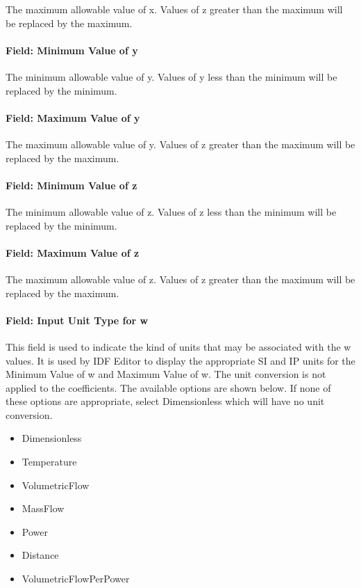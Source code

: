 The maximum allowable value of x. Values of z greater than the maximum will be replaced by the maximum.

\paragraph{Field: Minimum Value of y}\label{field-minimum-value-of-y}

The minimum allowable value of y. Values of y less than the minimum will be replaced by the minimum.

\paragraph{Field: Maximum Value of y}\label{field-maximum-value-of-y}

The maximum allowable value of y. Values of z greater than the maximum will be replaced by the maximum.

\paragraph{Field: Minimum Value of z}\label{field-minimum-value-of-z}

The minimum allowable value of z. Values of z less than the minimum will be replaced by the minimum.

\paragraph{Field: Maximum Value of z}\label{field-maximum-value-of-z}

The maximum allowable value of z. Values of z greater than the maximum will be replaced by the maximum.

\paragraph{Field: Input Unit Type for w}\label{field-input-unit-type-for-w}

This field is used to indicate the kind of units that may be associated with the w values. It is used by IDF Editor to display the appropriate SI and IP units for the Minimum Value of w and Maximum Value of w. The unit conversion is not applied to the coefficients. The available options are shown below. If none of these options are appropriate, select Dimensionless which will have no unit conversion.

\begin{itemize}
\item
  Dimensionless
\item
  Temperature
\item
  VolumetricFlow
\item
  MassFlow
\item
  Power
\item
  Distance
\item
  VolumetricFlowPerPower
\end{itemize}

